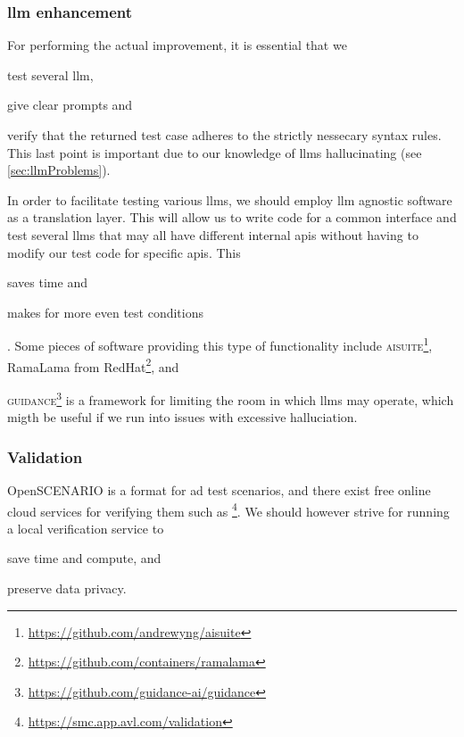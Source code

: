 \subsubsection{\acrshort{llm} enhancement}\label{sec:llmEnhancement}

For performing the actual improvement, it is essential that we \begin{inparaenum}
    \item test several \acrshort{llm},
    \item give clear prompts
    and
    \item verify that the returned test case adheres to the strictly nessecary
    syntax rules. This last point is important due to our knowledge of
    \acrshort{llms} hallucinating (see \cref{sec:llmProblems}).
\end{inparaenum}

In order to facilitate testing various \acrlong{llms}, we should employ
\acrshort{llm} agnostic software as a translation layer. This will allow us to
write code for a common interface and test several \acrshort{llms} that may all
have different internal \acrfull{apis} without having to modify our test code
for specific \acrshort{apis}. This \begin{inparaenum}
    \item saves time
    and
    \item makes for more even test conditions
\end{inparaenum}.
Some pieces of software providing this type of functionality include
\textsc{aisuite}\footnote{\url{https://github.com/andrewyng/aisuite}}, RamaLama
from RedHat\footnote{\url{https://github.com/containers/ramalama}}, and

\textsc{guidance}\footnote{\url{https://github.com/guidance-ai/guidance}} is a
framework for limiting the room in which \acrshort{llms} may operate, which
migth be useful if we run into issues with excessive halluciation.


\subsubsection{Validation}

OpenSCENARIO is a format for \acrshort{ad} test scenarios, and there exist free
online cloud services for verifying them such as
\footnote{\url{https://smc.app.avl.com/validation}}. We should however strive for
running a local verification service to \begin{inparaenum}
    \item save time and compute,
    and
    \item preserve data privacy.
\end{inparaenum}

